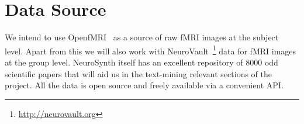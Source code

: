 \documentclass[11pt]{article}
\begin{document}
\begin{enumerate}
\end{enumerate}

\section{Data Source}
We intend to use OpenfMRI~\cite{poldrack2013toward} as a source of raw fMRI images at the subject level. Apart from this we will also work with NeuroVault~\footnote{\url{http://neurovault.org}} data for fMRI images at the group level. NeuroSynth itself has an excellent repository of $8000$ odd scientific papers that will aid us in the text-mining relevant sections of the project. All the data is open source and freely available via a convenient API. 

\small

\nocite{*}

\end{document}
